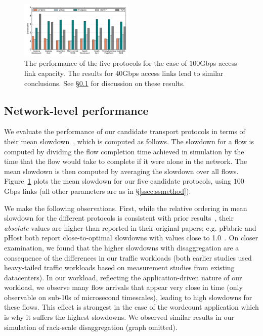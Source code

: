 %
\begin{figure}[t]
  \centering
      \includegraphics[width = 0.485\textwidth]{img/slowdowns/100g/allFlows_rack-scale_slowdowns} 
  \caption{\small{The performance of the five protocols for the case of $100$Gbps access link capacity. The results for $40$Gbps access links lead to similar conclusions. See \S\ref{ssec:nlp} for discussion on these results.}}
  \label{fig:phostp}
\end{figure}
%
\vspace{-0.1in}
\subsection{Network-level performance}
\label{ssec:nlp}
\vspace{-0.05in}
We evaluate the performance of our candidate transport protocols in terms of their  mean slowdown~\cite{pfabric}, which is computed as follows. The slowdown for a flow is computed by dividing the flow completion time achieved in simulation by the time that the flow would take to complete if it were alone in the network. The mean slowdown is then computed by averaging the slowdown over all flows.
Figure~\ref{fig:phostp} plots the mean slowdown for our five candidate protocols, using $100$Gbps links (all other parameters are as in \S\ref{ssec:ssmethod}). 

We make the following observations. 
First, while the relative ordering in mean slowdown for the different protocols is consistent with prior results~\cite{phost}, their \emph{absolute} values are higher than reported 
in their original papers; e.g. pFabric and pHost both report close-to-optimal slowdowns with values close to 1.0~\cite{phost,pfabric}. 
On closer examination, we found that the higher slowdowns with disaggregation are a consequence of the differences in our traffic workloads (both earlier studies used heavy-tailed traffic workloads based on measurement 
studies from existing datacenters). In our \dis workload, reflecting the 
application-driven nature of our workload, we observe many flow arrivals that 
appear very close in time (only observable on sub-10s of microsecond timescales), leading to high slowdowns for these flows. This effect is strongest in the case of the wordcount application which is why it suffers the highest slowdowns. 
We observed similar results in our simulation of rack-scale disaggregation (graph omitted).

